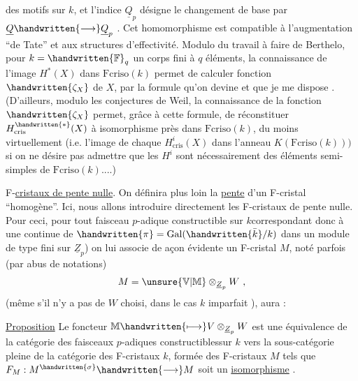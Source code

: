 
des motifs  sur $k$, et l'indice $\underline{Q}_p$ désigne le  changement de base par $\underline{Q}\handwritten{\longrightarrow}\underline{Q}_p$ . Cet homomorphisme est compatible à l'augmentation ``de Tate'' et aux structures d'effectivité. Modulo du travail à faire de Berthelo, pour $k=\handwritten{\mathbb{F}}_q$ un corps fini à $q$ éléments, la connaissance de l'image  $H^*(X)$ dans $\mathrm{Fcriso}(k)$ permet de calculer  fonction $\handwritten{\zeta_X}$ de $X$, par la formule qu'on devine et que je me dispose . (D'ailleurs, modulo les conjectures de Weil, la connaissance de la fonction $\handwritten{\zeta_X}$ permet, grâce à cette formule, de réconstituer $H^{\handwritten{*}}_{\mathrm{cris}}(X)$ à isomorphisme près dans $\mathrm{Fcriso}(k)$, du moins virtuellement (i.e. l'image de chaque $H^i_{\mathrm{cris}}(X)$ dans l'anneau $K(\mathrm{Fcriso}(k)))$ si on ne désire pas admettre que  les $H^i$ sont nécessairement des éléments semi-simples de $\mathrm{Fcriso}(k)$....)

 F-\uline{cristaux de  pente nulle}. On définira plus loin la \uline{pente} d'un F-cristal ``homogène''. Ici, nous allons introduire directement les F-cristaux de pente nulle. Pour ceci, pour tout faisceau $p$-adique constructible  sur $k$\handwritten{(}correspondant donc à une  continue de $\handwritten{\pi}=\operatorname{Gal}(\handwritten{\bar{k}}/k)$ dans un module de type fini sur $\underline{Z}_p$) on lui associe de açon évidente un F-cristal $M$, noté parfois (par abus de notations)
\[
M=\unsure{\mathbb{V}|\mathbb{M}}\otimes_{\underline{Z}_p}W\ ,
\]
(même s'il n'y a pas de $W$ choisi, dans le cas $k$ imparfait \handwritten{!} ),  aura :

\uline{Proposition} Le foncteur $\mathbb{M}\handwritten{\longmapsto}V\otimes_{\underline{Z}_p}W$ est une équivalence de la catégorie des faisceaux $p$-adiques constructibles\handwritten{\,}sur $k$ vers la sous-catégorie pleine de la catégorie des F-cristaux  $k$, formée des F-cristaux $M$ tels que $F_M : M^{\handwritten{\sigma}}\handwritten{\longrightarrow}M$ soit un \uline{isomorphisme} .

